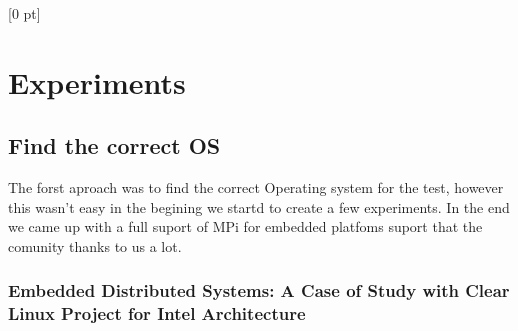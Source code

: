 \titlespacing{\chapter}{0 pt}{30 pt}{50 pt}[0 pt]
\titleformat{\section}{\Large\bfseries}{\thesection}{0 pt}{\hspace{30 pt}}
\titleformat{\subsection}{\large\bfseries}{\thesubsection}{0 pt}{\hspace{30 pt}}
\pagestyle{fancy}
\fancyhead[LO,LE]{\footnotesize\emph{\leftmark}}
\fancyhead[RO,RE]{\thepage}
\fancyfoot[CO,CE]{}

\chapter{Experiments}

\normalsize
\noindent

\section{Find the correct OS}
\noindent

    The forst aproach was to find the correct Operating system for the test,
    however this wasn't easy in the begining we startd to create a few
    experiments. In the end we came up with a full suport of MPi for embedded
    platfoms suport that the comunity thanks to us a lot.

    \subsection {Embedded Distributed Systems: A Case of Study with Clear Linux
    Project for Intel Architecture}
    \noindent



